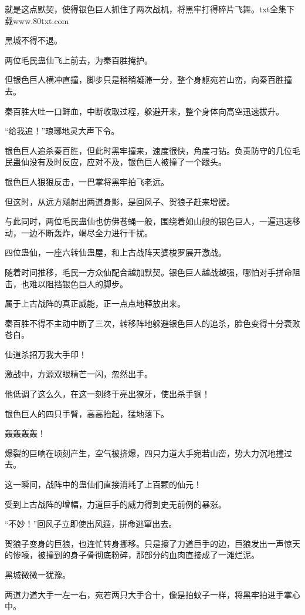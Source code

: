 \begin{this_body}
就是这点默契，使得银色巨人抓住了两次战机，将黑牢打得碎片飞舞。txt全集下载www.80txt.com

黑城不得不退。

两位毛民蛊仙飞上前去，为秦百胜掩护。

但银色巨人横冲直撞，脚步只是稍稍凝滞一分，整个身躯宛若山峦，向秦百胜撞去。

秦百胜大吐一口鲜血，中断收取过程，躲避开来，整个身体向高空迅速拔升。

“给我追！”琅琊地灵大声下令。

银色巨人追杀秦百胜，但此时黑牢撞来，速度很快，角度刁钻。负责防守的几位毛民蛊仙没有及时反应，应对不及，银色巨人被撞了一个跟头。

银色巨人狠狠反击，一巴掌将黑牢拍飞老远。

但这时，从远方飚射出两道身影，是回风子、贺狼子赶来增援。

与此同时，两位毛民蛊仙也仿佛苍蝇一般，围绕着如山般的银色巨人，一遍迅速移动，一边不断轰炸，竭尽全力进行干扰。

四位蛊仙，一座六转仙蛊屋，和上古战阵天婆梭罗展开激战。

随着时间推移，毛民一方众仙配合越加默契。银色巨人越战越强，哪怕对手拼命阻击，也难以阻挡银色巨人的脚步。

属于上古战阵的真正威能，正一点点地释放出来。

秦百胜不得不主动中断了三次，转移阵地躲避银色巨人的追杀，脸色变得十分衰败苍白。

仙道杀招万我大手印！

激战中，方源双眼精芒一闪，忽然出手。

他低调了这么久，在这一刻终于亮出獠牙，使出杀手锏！

银色巨人的四只手臂，高高抬起，猛地落下。

轰轰轰轰！

爆裂的巨响在顷刻产生，空气被挤爆，四只力道大手宛若山峦，势大力沉地撞过去。

这一瞬间，战阵中的蛊仙们直接消耗了上百颗的仙元！

受到上古战阵的增幅，力道巨手的威力得到史无前例的暴涨。

“不妙！”回风子立即使出风遁，拼命逃窜出去。

贺狼子变身的巨狼，也连忙转身挪移。只是擦了力道巨手的边，巨狼发出一声惊天的惨嚎，被撞到的身子骨彻底粉碎，那部分的血肉直接成了一滩烂泥。

黑城微微一犹豫。

两道力道大手一左一右，宛若两只大手合十，像是拍蚊子一样，将黑牢拍进手掌心中。


\end{this_body}
